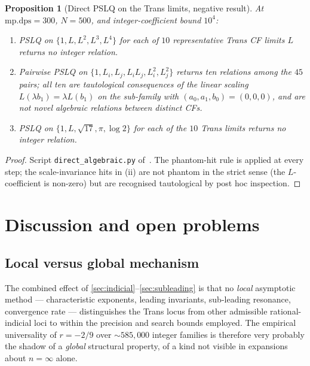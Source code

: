\documentclass[11pt]{amsart}
\newtheorem{proposition}[theorem]{Proposition}
\theoremstyle{definition}
\theoremstyle{remark}
\begin{document}
\begin{proposition}[Direct PSLQ on the Trans limits, negative result]
\label{prop:pslq-direct}
At $\mathrm{mp.dps} = 300$, $N=500$, and integer-coefficient bound
$10^4$:
\begin{enumerate}[label={\upshape(\roman*)}]
\item PSLQ on $\{1,L,L^2,L^3,L^4\}$ for each of $10$ representative
Trans CF limits $L$ returns no integer relation.
\item Pairwise PSLQ on $\{1,L_i,L_j,L_iL_j,L_i^2,L_j^2\}$ returns ten
relations among the $45$ pairs; all ten are tautological consequences
of the linear scaling $L(\lambda b_1) = \lambda L(b_1)$ on the
sub-family with $(a_0,a_1,b_0) = (0,0,0)$, and are not novel
algebraic relations between distinct CFs.
\item PSLQ on $\{1,L,\sqrt{17},\pi,\log 2\}$ for each of the $10$
Trans limits returns no integer relation.
\end{enumerate}
\end{proposition}
\begin{proof}
Script \texttt{direct\_algebraic.py} of~\cite{SprintW3Report}.
The phantom-hit rule is applied at every step; the scale-invariance
hits in (ii) are not phantom in the strict sense (the
$L$-coefficient is non-zero) but are recognised tautological by post
hoc inspection.
\end{proof}

\section{Discussion and open problems}\label{sec:discussion}

\subsection{Local versus global mechanism}

The combined effect of \textsection\textsection\ref{sec:indicial}--\ref{sec:subleading}
is that no \emph{local} asymptotic method --- characteristic
exponents, leading invariants, sub-leading resonance, convergence
rate --- distinguishes the Trans locus from other admissible
rational-indicial loci to within the precision and search bounds
employed.  The empirical universality of $r=-2/9$ over
$\sim\!585{,}000$ integer families is therefore very probably the
shadow of a \emph{global} structural property, of a kind not visible
in expansions about $n=\infty$ alone.
\end{document}
